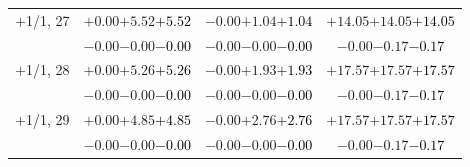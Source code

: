 \documentclass[compress]{beamer}
\begin{document}
\begin{frame}
\begin{tabular}{r | c | c | c}
$+$1/1, 27 & $+0.00$\hspace{0.1 cm}$+5.52$\hspace{0.1 cm}\textcolor{black}{$+5.52$} & $-0.00$\hspace{0.1 cm}$+1.04$\hspace{0.1 cm}\textcolor{black}{$+1.04$} & $+14.05$\hspace{0.1 cm}$+14.05$\hspace{0.1 cm}\textcolor{black}{$+14.05$} \\
           & $-0.00$\hspace{0.1 cm}$-0.00$\hspace{0.1 cm}\textcolor{black}{$-0.00$} & $-0.00$\hspace{0.1 cm}$-0.00$\hspace{0.1 cm}\textcolor{black}{$-0.00$} & $-0.00$\hspace{0.1 cm}$-0.17$\hspace{0.1 cm}\textcolor{black}{$-0.17$} \\
$+$1/1, 28 & $+0.00$\hspace{0.1 cm}$+5.26$\hspace{0.1 cm}\textcolor{black}{$+5.26$} & $-0.00$\hspace{0.1 cm}$+1.93$\hspace{0.1 cm}\textcolor{black}{$+1.93$} & $+17.57$\hspace{0.1 cm}$+17.57$\hspace{0.1 cm}\textcolor{black}{$+17.57$} \\
           & $-0.00$\hspace{0.1 cm}$-0.00$\hspace{0.1 cm}\textcolor{black}{$-0.00$} & $-0.00$\hspace{0.1 cm}$-0.00$\hspace{0.1 cm}\textcolor{black}{$-0.00$} & $-0.00$\hspace{0.1 cm}$-0.17$\hspace{0.1 cm}\textcolor{black}{$-0.17$} \\
$+$1/1, 29 & $+0.00$\hspace{0.1 cm}$+4.85$\hspace{0.1 cm}\textcolor{black}{$+4.85$} & $-0.00$\hspace{0.1 cm}$+2.76$\hspace{0.1 cm}\textcolor{black}{$+2.76$} & $+17.57$\hspace{0.1 cm}$+17.57$\hspace{0.1 cm}\textcolor{black}{$+17.57$} \\
           & $-0.00$\hspace{0.1 cm}$-0.00$\hspace{0.1 cm}\textcolor{black}{$-0.00$} & $-0.00$\hspace{0.1 cm}$-0.00$\hspace{0.1 cm}\textcolor{black}{$-0.00$} & $-0.00$\hspace{0.1 cm}$-0.17$\hspace{0.1 cm}\textcolor{black}{$-0.17$} \\

\end{tabular}
\end{frame}
\end{document}
